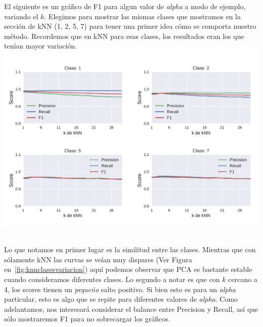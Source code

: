 El siguiente es un gráfico de F1 para algun valor de \textit{alpha} a modo de ejemplo, variando el $k$. Elegimos para mostrar las mismas clases que mostramos en la sección de kNN (1, 2, 5, 7) para tener una primer idea cómo se comporta nuestro método. Recordemos que en kNN para esas clases, los resultados eran los que tenían mayor variación. \\

{\centering
    \includegraphics[scale=0.65]{informe/imagenes/pca/variacionKClases1257PresRecall.pdf} \\
}
$ $\newline

Lo que notamos en primer lugar es la similitud entre las clases. Mientras que con sólamente kNN las curvas se veían muy dispares (Ver Figura en~\ref{fig:knnclasesvariacion}) aquí podemos observar que PCA es bastante estable cuando consideramos diferentes clases. Lo segundo a notar es que con $k$ cercano a 4, los scores tienen un \textit{pequeño} salto positivo. Si bien esto es para un \textit{alpha} particular, esto es algo que se repite para diferentes valores de \textit{alpha}. Como adelantamos, nos interesará considerar el balance entre Precision y Recall, así que sólo mostraremos F1 para no sobrecargar los gráficos. \\


